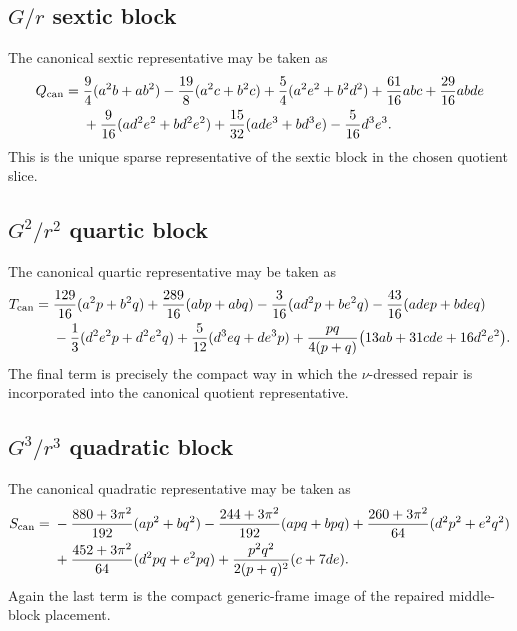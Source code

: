 \documentclass[11pt]{article}
\begin{document}
\subsection{\texorpdfstring{$G/r$}{G/r} sextic block}
\label{app:com-null-slice-gr}

The canonical sextic representative may be taken as
\begin{align}
Q_{\rm can}={}&
\frac94(a^2b+ab^2)
-\frac{19}{8}(a^2c+b^2c)
+\frac54(a^2e^2+b^2d^2)
+\frac{61}{16}abc
+\frac{29}{16}abde
\notag\\
&
+\frac{9}{16}(ad^2e^2+bd^2e^2)
+\frac{15}{32}(ade^3+bd^3e)
-\frac{5}{16}d^3e^3.
\label{eq:app-com-null-Qcan}
\end{align}
This is the unique sparse representative of the sextic block in the chosen
quotient slice.

\subsection{\texorpdfstring{$G^2/r^2$}{G squared/r squared} quartic block}
\label{app:com-null-slice-g2}

The canonical quartic representative may be taken as
\begin{align}
T_{\rm can}={}&
\frac{129}{16}(a^2p+b^2q)
+\frac{289}{16}(abp+abq)
-\frac{3}{16}(ad^2p+be^2q)
-\frac{43}{16}(adep+bdeq)
\notag\\
&
-\frac13(d^2e^2p+d^2e^2q)
+\frac{5}{12}(d^3eq+de^3p)
+\frac{pq}{4(p+q)}\bigl(13ab+31cde+16d^2e^2\bigr).
\label{eq:app-com-null-Tcan}
\end{align}
The final term is precisely the compact way in which the $\nu$-dressed repair is
incorporated into the canonical quotient representative.

\subsection{\texorpdfstring{$G^3/r^3$}{G cubed/r cubed} quadratic block}
\label{app:com-null-slice-g3}

The canonical quadratic representative may be taken as
\begin{align}
S_{\rm can}={}&
-\frac{880+3\pi^2}{192}(ap^2+bq^2)
-\frac{244+3\pi^2}{192}(apq+bpq)
+\frac{260+3\pi^2}{64}(d^2p^2+e^2q^2)
\notag\\
&
+\frac{452+3\pi^2}{64}(d^2pq+e^2pq)
+\frac{p^2q^2}{2(p+q)^2}(c+7de).
\label{eq:app-com-null-Scan}
\end{align}
Again the last term is the compact generic-frame image of the repaired
middle-block placement.
\end{document}

